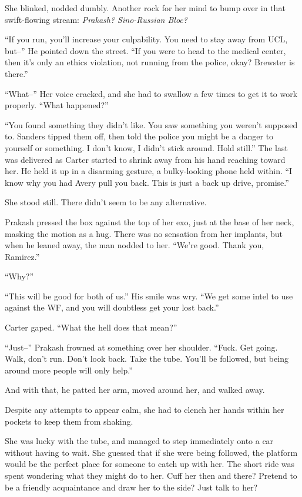 She blinked, nodded dumbly. Another rock for her mind to bump over in that swift-flowing stream: \emph{Prakash? Sino-Russian Bloc?}

``If you run, you'll increase your culpability. You need to stay away from UCL, but--'' He pointed down the street. ``If you were to head to the medical center, then it's only an ethics violation, not running from the police, okay? Brewster is there.''

``What--'' Her voice cracked, and she had to swallow a few times to get it to work properly. ``What happened?''

``You found something they didn't like. You saw something you weren't supposed to. Sanders tipped them off, then told the police you might be a danger to yourself or something. I don't know, I didn't stick around. Hold still.'' The last was delivered as Carter started to shrink away from his hand reaching toward her. He held it up in a disarming gesture, a bulky-looking phone held within. ``I know why you had Avery pull you back. This is just a back up drive, promise.''

She stood still. There didn't seem to be any alternative.

Prakash pressed the box against the top of her exo, just at the base of her neck, masking the motion as a hug. There was no sensation from her implants, but when he leaned away, the man nodded to her. ``We're good. Thank you, Ramirez.''

``Why?''

``This will be good for both of us.'' His smile was wry. ``We get some intel to use against the WF, and you will doubtless get your lost back.''

Carter gaped. ``What the hell does that mean?''

``Just--'' Prakash frowned at something over her shoulder. ``Fuck. Get going. Walk, don't run. Don't look back. Take the tube. You'll be followed, but being around more people will only help.''

And with that, he patted her arm, moved around her, and walked away.

Despite any attempts to appear calm, she had to clench her hands within her pockets to keep them from shaking.

She was lucky with the tube, and managed to step immediately onto a car without having to wait. She guessed that if she were being followed, the platform would be the perfect place for someone to catch up with her. The short ride was spent wondering what they might do to her. Cuff her then and there? Pretend to be a friendly acquaintance and draw her to the side? Just talk to her?

